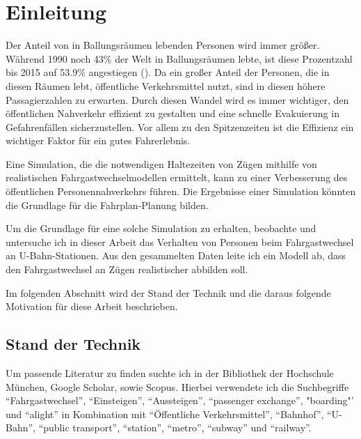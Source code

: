 \chapter{Einleitung} \label{Einleitung}
Der Anteil von in Ballungsräumen lebenden Personen wird immer größer. Während 1990 noch 43\% der Welt in Ballungsräumen lebte, ist diese Prozentzahl bis 2015 auf 53.9\% angestiegen (\cite{UnitedNations.2018}). Da ein großer Anteil der Personen, die in diesen Räumen lebt, öffentliche Verkehrsmittel nutzt, sind in diesen höhere Passagierzahlen zu  erwarten. Durch diesen Wandel wird es immer wichtiger, den öffentlichen Nahverkehr effizient zu gestalten und eine schnelle Evakuierung in Gefahrenfällen sicherzustellen. Vor allem zu den Spitzenzeiten ist die Effizienz ein wichtiger Faktor für ein gutes Fahrerlebnis.

Eine Simulation, die die notwendigen Haltezeiten von Zügen mithilfe von realistischen Fahrgastwechselmodellen ermittelt, kann zu einer Verbesserung des öffentlichen Personennahverkehrs führen. Die Ergebnisse einer Simulation könnten die Grundlage für die Fahrplan-Planung bilden.

Um die Grundlage für eine solche Simulation zu erhalten, beobachte und untersuche ich in dieser Arbeit das Verhalten von Personen beim Fahrgastwechsel an U-Bahn-Stationen. Aus den gesammelten Daten leite ich ein Modell ab, dass den Fahrgastwechsel an Zügen realistischer abbilden soll.

Im folgenden Abschnitt wird der Stand der Technik und die daraus folgende Motivation für diese Arbeit beschrieben.
\section{Stand der Technik} \label{Stand der Technik}
Um passende Literatur zu finden suchte ich in der Bibliothek der Hochschule München, Google Scholar, sowie Scopus. Hierbei verwendete ich die Suchbegriffe "`Fahrgastwechsel"', "`Einsteigen"', "`Aussteigen"', "`passenger exchange"', "boarding"' und "`alight"' in Kombination mit "`Öffentliche Verkehrsmittel"', "`Bahnhof"', "`U-Bahn"', "`public transport"', "`station"', "`metro"', "`subway"' und "`railway"'.

